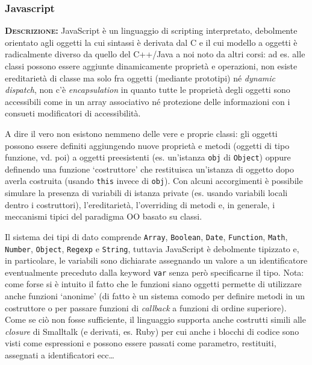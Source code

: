 \subsubsection{Javascript}
\begin{description}
	\item{\scshape\bfseries Descrizione:}
  JavaScript è un linguaggio di scripting interpretato, debolmente orientato agli oggetti la cui sintassi è derivata dal C e il cui modello a oggetti è radicalmente diverso da quello  del C++/Java a noi noto da altri corsi: ad es. alle classi possono essere aggiunte dinamicamente proprietà e operazioni, non esiste ereditarietà di classe ma solo fra oggetti (mediante prototipi) né \textit{dynamic dispatch}, non c'è \textit{encapsulation} in quanto tutte le proprietà degli oggetti sono accessibili come in un array associativo né protezione delle informazioni con i consueti modificatori di accessibilità.
  
  A dire il vero non esistono nemmeno delle vere e proprie classi: gli oggetti possono essere definiti aggiungendo nuove proprietà e metodi (oggetti di tipo funzione, vd. poi) a oggetti preesistenti (es. un'istanza \texttt{obj} di \texttt{Object}) oppure definendo una funzione `costruttore' che restituisca un'istanza di oggetto dopo averla costruita (usando \texttt{this} invece di \texttt{obj}). Con alcuni accorgimenti è possibile simulare la presenza di variabili di istanza private (es. usando variabili locali dentro i costruttori), l'ereditarietà, l'overriding di metodi e, in generale, i meccanismi tipici del paradigma OO basato su classi.
  
  Il sistema dei tipi di dato comprende \texttt{Array}, \texttt{Boolean}, \texttt{Date}, \texttt{Function}, \texttt{Math}, \texttt{Number}, \texttt{Object}, \texttt{Regexp} e \texttt{String}, tuttavia JavaScript è debolmente tipizzato e, in particolare, le variabili sono dichiarate assegnando un valore a un identificatore eventualmente preceduto dalla keyword \texttt{var} senza però specificarne il tipo. Nota: come forse si è intuito il fatto che le funzioni siano oggetti permette di utilizzare anche funzioni `anonime' (di fatto è un sistema comodo per definire metodi in un costruttore o per passare funzioni di \textit{callback} a funzioni di ordine superiore). Come se ciò non fosse sufficiente, il linguaggio supporta anche costrutti simili alle \textit{closure} di Smalltalk (e derivati, es. Ruby) per cui anche i blocchi di codice sono visti come espressioni e possono essere passati come parametro, restituiti, assegnati a identificatori ecc\dots  
  

\end{description}
